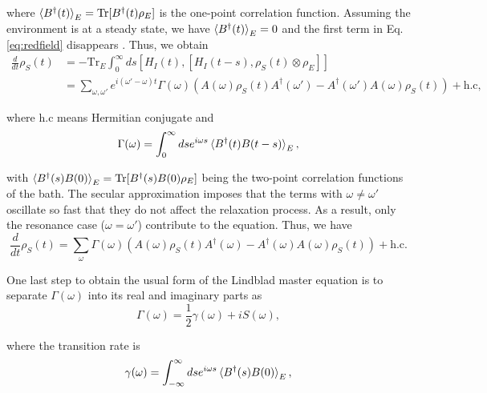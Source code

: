 \noindent where $\braket{{B}^\dagger (t)}_E = \text{Tr}[{B}^\dagger (t) {\rho}_E]$ is the one-point correlation function. Assuming the environment is at a steady state, we have $\braket{{B}^\dagger (t)}_E = 0$ and the first term in Eq. \eqref{eq:redfield} disappears \cite{stefanini-2026, lidar-2020}. Thus, we obtain
\begin{equation}
    \begin{split}
        \frac{d}{dt} {\rho}_{S}(t) &= - \text{Tr}_E\int_{0}^{\infty} ds [{H}_I(t), [{H}_I(t-s), {\rho}_S (t) \otimes {\rho}_E]]\\
        &= \sum_{\omega, \omega'} e^{i (\omega' - \omega)t} \Gamma (\omega) ({A} (\omega) {\rho}_S (t) {A}^\dagger (\omega') - {A}^\dagger (\omega') {A} (\omega) {\rho}_S (t)) + \text{h.c},
    \end{split}
\end{equation}

\noindent where $\text{h.c}$ means Hermitian conjugate and
\begin{equation}
    \Gamma (\omega) = \int_0^{\infty} ds e^{i\omega s} \braket{{B}^\dagger (t) {B} (t-s)}_E,
\end{equation}

\noindent with $\braket{{B}^\dagger (s) {B} (0)}_E = \text{Tr}[{B}^\dagger (s) {B} (0) {\rho}_E]$ being the two-point correlation functions of the bath. The secular approximation imposes that the terms with $\omega \neq \omega'$ oscillate so fast that they do not affect the relaxation process. As a result, only the resonance case ($\omega = \omega'$) contribute to the equation. Thus, we have
\begin{equation}
    \frac{d}{dt} {\rho}_{S}(t) = \sum_{\omega} \Gamma (\omega) ({A} (\omega) {\rho}_S (t) {A}^\dagger (\omega) - {A}^\dagger (\omega) {A} (\omega) {\rho}_S (t)) + \text{h.c}.
\end{equation}

\noindent One last step to obtain the usual form of the Lindblad master equation is to separate $\Gamma(\omega)$ into its real and imaginary parts as
\begin{equation}
    \Gamma (\omega) = \frac{1}{2} \gamma (\omega) + i S (\omega),
    \label{eq:Gamma-coef}
\end{equation}

\noindent where the transition rate is
\begin{equation}
    \gamma (\omega) = \int_{-\infty}^{\infty} ds e^{i \omega s} \braket{{B}^\dagger (s) {B} (0)}_E,
    \label{eq:gamma-coef}
\end{equation}

